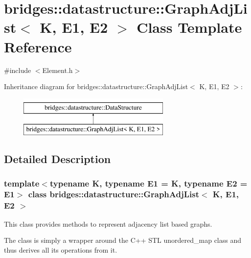 \hypertarget{classbridges_1_1datastructure_1_1_graph_adj_list}{}\section{bridges\+::datastructure\+::Graph\+Adj\+List$<$ K, E1, E2 $>$ Class Template Reference}
\label{classbridges_1_1datastructure_1_1_graph_adj_list}


{\ttfamily \#include $<$Element.\+h$>$}

Inheritance diagram for bridges\+::datastructure\+::Graph\+Adj\+List$<$ K, E1, E2 $>$\+:\begin{figure}[H]
\begin{center}
\leavevmode
\includegraphics[height=2.000000cm]{classbridges_1_1datastructure_1_1_graph_adj_list}
\end{center}
\end{figure}


\subsection{Detailed Description}
\subsubsection*{template$<$typename K, typename E1 = K, typename E2 = E1$>$\newline
class bridges\+::datastructure\+::\+Graph\+Adj\+List$<$ K, E1, E2 $>$}

This class provides methods to represent adjacency list based graphs. 

The class is simply a wrapper around the C++ S\+TL unordered\+\_\+map class and thus derives all its operations from it.


